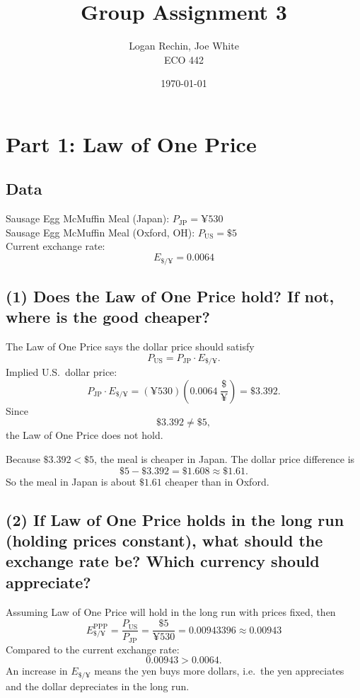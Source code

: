 \documentclass[11pt]{article}
\newcommand{\usd}{\text{\$}}
\begin{document}
\title{Group Assignment 3}
\author{Logan Rechin, Joe White\\ECO 442}
\date{\today}
\maketitle

\section*{Part 1: Law of One Price}

\subsection*{Data}
Sausage Egg McMuffin Meal (Japan): $P_{\text{JP}} = \yen 530$\\
Sausage Egg McMuffin Meal (Oxford, OH): $P_{\text{US}} = \usd 5$\\
Current exchange rate:
\[
E_{\usd/\yen} = 0.0064
\]

\subsection*{(1) Does the Law of One Price hold? If not, where is the good cheaper?}
The Law of One Price says the dollar price should satisfy
\[
P_{\text{US}} = P_{\text{JP}}\cdot E_{\usd/\yen}.
\]
Implied U.S.\ dollar price:
\[
P_{\text{JP}}\cdot E_{\usd/\yen}
= (\yen 530)\left(0.0064\ \frac{\usd}{\yen}\right)
= \usd 3.392.
\]
Since
\[
\usd 3.392 \neq \usd 5,
\]
the Law of One Price does not hold.

Because $\usd 3.392 < \usd 5$, the meal is cheaper in Japan. The dollar price difference is
\[
\usd 5 - \usd 3.392 = \usd 1.608 \approx \usd 1.61.
\]
So the meal in Japan is about $\usd 1.61$ cheaper than in Oxford.

\subsection*{(2) If Law of One Price holds in the long run (holding prices constant), what should the exchange rate be? Which currency should appreciate?}
Assuming Law of One Price will hold in the long run with prices fixed, then
\[
E_{\usd/\yen}^{\text{PPP}}
= \frac{P_{\text{US}}}{P_{\text{JP}}}
= \frac{\usd 5}{\yen 530}
= 0.00943396
\approx 0.00943
\]
Compared to the current exchange rate:
\[
0.00943 > 0.0064.
\]
An increase in $E_{\usd/\yen}$ means the yen buys more dollars, i.e.\ the yen appreciates and the dollar depreciates in the long run.
\end{document}
